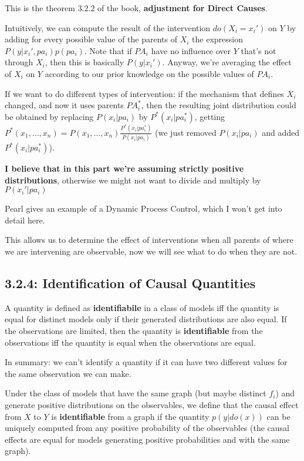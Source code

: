 This is the theorem $3.2.2$ of the book, \textbf{adjustment for Direct Causes}.

Intuitively, we can compute the result of the intervention $do(X_i = x_i')$ on $Y$ by adding for every possible value of the parents of $X_i$ the expression $P(y|x_i',pa_i)p(pa_i)$. Note that if $PA_i$ have no influence over $Y$ that's not through $X_i$, then this is basically $P(y|x_i')$. Anyway, we're averaging the effect of $X_i$ on $Y$ according to our prior knowledge on the possible values of $PA_i$.

If we want to do different types of intervention: if the mechanism that defines $X_i$ changed, and now it uses parents $PA_i^*$, then the resulting joint distribution could be obtained by replacing $P(x_i|pa_i)$ by $P^*(x_i|pa_i^*)$, getting $P^*(x_1,...,x_n) = P(x_1,...,x_n)\frac{P^*(x_i|pa_i^*)}{P(x_i|pa_i)}$ (we just removed $P(x_i|pa_i)$ and added $P^*(x_i|pa_i^*)$).

\textbf{I believe that in this part we're assuming strictly positive distributions}, otherwise we might not want to divide and multiply by $P(x_i'|pa_i)$

Pearl gives an example of a Dynamic Process Control, which I won't get into detail here.

This allows us to determine the effect of interventions when all parents of where we are intervening are observable, now we will see what to do when they are not.

\subsection{3.2.4: Identification of Causal Quantities}

A quantity is defined as \textbf{identifiabile} in a class of models iff the quantity is equal for distinct models only if their generated distributions are also equal. If the observations are limited, then the quantity is \textbf{identifiable} from the observations iff the quantity is equal when the observations are equal. 

In summary: we can't identify a quantity if it can have two different values for the same observation we can make.

Under the class of models that have the same graph (but maybe distinct $f_i$) and generate positive distributions on the observables, we define that the causal effect from $X$ to $Y$ is \textbf{identifiable} from a graph if the quantity $p(y|do(x))$ can be uniquely computed from any positive probability of the observables (the causal effects are equal for models generating positive probabilities and with the same graph).

